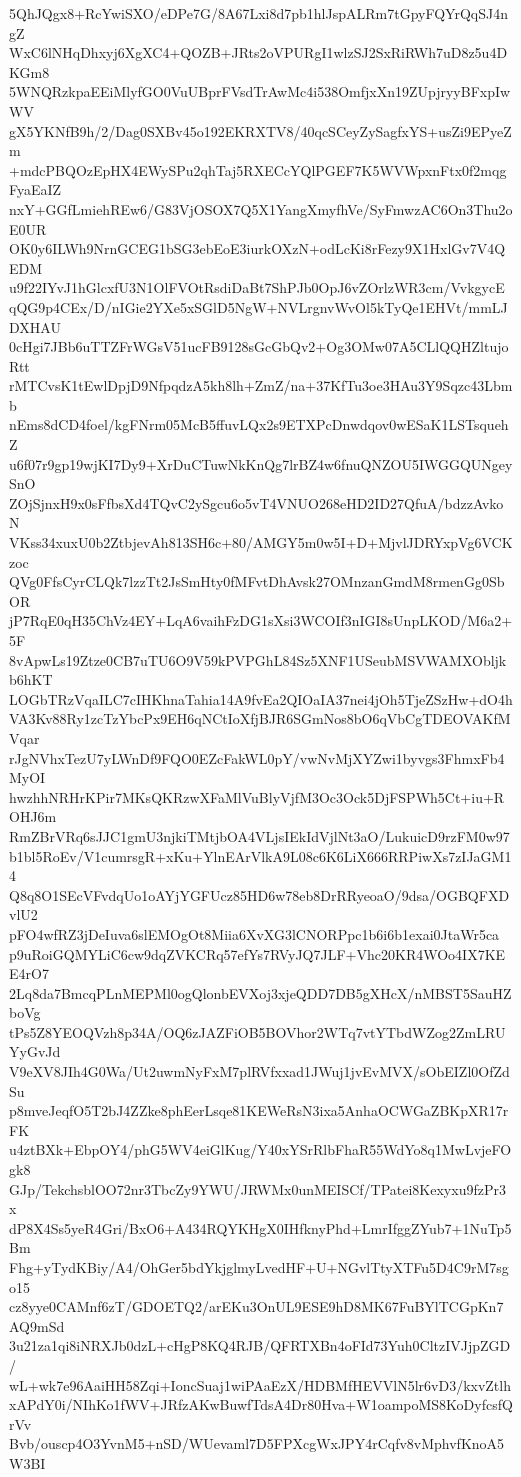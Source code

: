 5QhJQgx8+RcYwiSXO/eDPe7G/8A67Lxi8d7pb1hlJspALRm7tGpyFQYrQqSJ4ngZ
WxC6lNHqDhxyj6XgXC4+QOZB+JRts2oVPURgI1wlzSJ2SxRiRWh7uD8z5u4DKGm8
5WNQRzkpaEEiMlyfGO0VuUBprFVsdTrAwMc4i538OmfjxXn19ZUpjryyBFxpIwWV
gX5YKNfB9h/2/Dag0SXBv45o192EKRXTV8/40qcSCeyZySagfxYS+usZi9EPyeZm
+mdcPBQOzEpHX4EWySPu2qhTaj5RXECcYQlPGEF7K5WVWpxnFtx0f2mqgFyaEaIZ
nxY+GGfLmiehREw6/G83VjOSOX7Q5X1YangXmyfhVe/SyFmwzAC6On3Thu2oE0UR
OK0y6ILWh9NrnGCEG1bSG3ebEoE3iurkOXzN+odLcKi8rFezy9X1HxlGv7V4QEDM
u9f22IYvJ1hGlcxfU3N1OlFVOtRsdiDaBt7ShPJb0OpJ6vZOrlzWR3cm/VvkgycE
qQG9p4CEx/D/nIGie2YXe5xSGlD5NgW+NVLrgnvWvOl5kTyQe1EHVt/mmLJDXHAU
0cHgi7JBb6uTTZFrWGsV51ucFB9128sGcGbQv2+Og3OMw07A5CLlQQHZltujoRtt
rMTCvsK1tEwlDpjD9NfpqdzA5kh8lh+ZmZ/na+37KfTu3oe3HAu3Y9Sqzc43Lbmb
nEms8dCD4foel/kgFNrm05McB5ffuvLQx2s9ETXPcDnwdqov0wESaK1LSTsquehZ
u6f07r9gp19wjKI7Dy9+XrDuCTuwNkKnQg7lrBZ4w6fnuQNZOU5IWGGQUNgeySnO
ZOjSjnxH9x0sFfbsXd4TQvC2ySgcu6o5vT4VNUO268eHD2ID27QfuA/bdzzAvkoN
VKss34xuxU0b2ZtbjevAh813SH6c+80/AMGY5m0w5I+D+MjvlJDRYxpVg6VCKzoc
QVg0FfsCyrCLQk7lzzTt2JsSmHty0fMFvtDhAvsk27OMnzanGmdM8rmenGg0SbOR
jP7RqE0qH35ChVz4EY+LqA6vaihFzDG1sXsi3WCOIf3nIGI8sUnpLKOD/M6a2+5F
8vApwLs19Ztze0CB7uTU6O9V59kPVPGhL84Sz5XNF1USeubMSVWAMXObljkb6hKT
LOGbTRzVqaILC7cIHKhnaTahia14A9fvEa2QIOaIA37nei4jOh5TjeZSzHw+dO4h
VA3Kv88Ry1zcTzYbcPx9EH6qNCtIoXfjBJR6SGmNos8bO6qVbCgTDEOVAKfMVqar
rJgNVhxTezU7yLWnDf9FQO0EZcFakWL0pY/vwNvMjXYZwi1byvgs3FhmxFb4MyOI
hwzhhNRHrKPir7MKsQKRzwXFaMlVuBlyVjfM3Oc3Ock5DjFSPWh5Ct+iu+ROHJ6m
RmZBrVRq6sJJC1gmU3njkiTMtjbOA4VLjsIEkIdVjlNt3aO/LukuicD9rzFM0w97
b1bl5RoEv/V1cumrsgR+xKu+YlnEArVlkA9L08c6K6LiX666RRPiwXs7zIJaGM14
Q8q8O1SEcVFvdqUo1oAYjYGFUcz85HD6w78eb8DrRRyeoaO/9dsa/OGBQFXDvlU2
pFO4wfRZ3jDeIuva6slEMOgOt8Miia6XvXG3lCNORPpc1b6i6b1exai0JtaWr5ca
p9uRoiGQMYLiC6cw9dqZVKCRq57efYs7RVyJQ7JLF+Vhc20KR4WOo4IX7KEE4rO7
2Lq8da7BmcqPLnMEPMl0ogQlonbEVXoj3xjeQDD7DB5gXHcX/nMBST5SauHZboVg
tPs5Z8YEOQVzh8p34A/OQ6zJAZFiOB5BOVhor2WTq7vtYTbdWZog2ZmLRUYyGvJd
V9eXV8JIh4G0Wa/Ut2uwmNyFxM7plRVfxxad1JWuj1jvEvMVX/sObEIZl0OfZdSu
p8mveJeqfO5T2bJ4ZZke8phEerLsqe81KEWeRsN3ixa5AnhaOCWGaZBKpXR17rFK
u4ztBXk+EbpOY4/phG5WV4eiGlKug/Y40xYSrRlbFhaR55WdYo8q1MwLvjeFOgk8
GJp/TekchsblOO72nr3TbcZy9YWU/JRWMx0unMEISCf/TPatei8Kexyxu9fzPr3x
dP8X4Ss5yeR4Gri/BxO6+A434RQYKHgX0IHfknyPhd+LmrIfggZYub7+1NuTp5Bm
Fhg+yTydKBiy/A4/OhGer5bdYkjglmyLvedHF+U+NGvlTtyXTFu5D4C9rM7sgo15
cz8yye0CAMnf6zT/GDOETQ2/arEKu3OnUL9ESE9hD8MK67FuBYlTCGpKn7AQ9mSd
3u21za1qi8iNRXJb0dzL+cHgP8KQ4RJB/QFRTXBn4oFId73Yuh0CltzIVJjpZGD/
wL+wk7e96AaiHH58Zqi+IoncSuaj1wiPAaEzX/HDBMfHEVVlN5lr6vD3/kxvZtlh
xAPdY0i/NIhKo1fWV+JRfzAKwBuwfTdsA4Dr80Hva+W1oampoMS8KoDyfcsfQrVv
Bvb/ouscp4O3YvnM5+nSD/WUevaml7D5FPXcgWxJPY4rCqfv8vMphvfKnoA5W3BI
